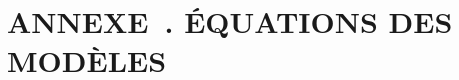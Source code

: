 \documentclass[11pt]{book}
\def\startP{222}         %
\def\startF{0}           %
\def\startT{0}           %
\begin{document}
\setcounter{page}{\startP}
\setcounter{figure}{\startF}
\setcounter{table}{\startT}
\setcounter{secnumdepth}{3}    %
\setlength{\tabcolsep}{3pt}   %


\setlength{}
\setlength{}
\def\LT@startpbox#1{%
  \bgroup
  \color@begingroup%
    \let\@footnotetext\LT@p@ftntext
    \setlength\hsize{#1}%
    \@arrayparboxrestore
   \everypar{%
      \vrule \@height \ht\@arstrutbox \@width \z@
      \everypar{}}%
}

\setcounter{chapter}{5}    %
\renewcommand{\thechapter}{\Alph{chapter}} %
\renewcommand{\thesection}{\thechapter.\arabic{section}.}
\renewcommand{\thesubsection}{\thechapter.\arabic{section}.\arabic{subsection}.}
\renewcommand{\thesubsubsection}{\thechapter.\arabic{section}.\arabic{subsection}.\arabic{subsubsection}.}
\renewcommand{\thesubsubsubsection}{\thechapter.\arabic{section}.\arabic{subsection}.\arabic{subsubsection}.\arabic{subsubsubsection}.}
\renewcommand{\thetable}{\thechapter.\arabic{table}}    
\renewcommand{\thefigure}{\thechapter.\arabic{figure}}  
\renewcommand{\theequation}{\thechapter.\arabic{equation}}

\setcounter{prevchapter}{\value{chapter}}
\addtocounter{prevchapter}{-1}
\newcommand{\eqnchapter}{\Alph{prevchapter}}

\def\finalYr{2023}  %
\def\ncomm{2}       %
\def\nsurv{6}       %
\def\gsurv{3,...,8}     %
\def\gcomm{1,...,2}     %
\def\ugees{1,3,4,5}     %
\def\qgees{1,3,...,8}     %

\newcommand{\spn}{s\'{e}baste canari}
\newcommand{\spc}{SCA}


\chapter*{ANNEXE~\thechapter. \'{E}QUATIONS DES MOD\`{E}LES}
\end{document}
